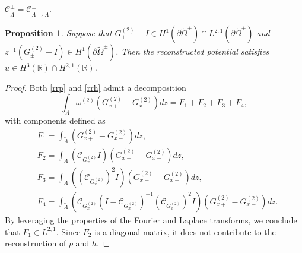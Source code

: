 \documentclass[preprint,compress,12pt]{elsarticle}
\newtheorem{proposition}[theorem]{Proposition}
\numberwithin{equation}{section}
\begin{document}
$\mathcal{C}_{\widetilde{\Lambda}}^{\pm}=\mathcal{C}_{\widetilde{\Lambda}\rightarrow\widetilde{\Lambda}}^{\pm}$.
\begin{proposition}\label{refa}
Suppose that $G^{(2)}_{\pm}-I\in H^{1}(\partial\widetilde{\Omega}^{\pm})\cap L^{2,1}(\partial\widetilde{\Omega}^{\pm})$
 and $z^{-1}(G^{(2)}_{\pm}-I )\in H^{1}(\partial\widetilde{\Omega}^{\pm})$.
Then the reconstructed potential satisfies $u\in H^{3}(\mathbb{R})\cap H^{2,1}(\mathbb{R})$.
\end{proposition}
\begin{proof}
Both \eqref{rrp} and \eqref{rrh} admit a decomposition
\begin{equation}\label{sgb}
\int_{\widetilde{\Lambda}}\omega^{(2)}\left(G^{(2)}_{x+}-G^{(2)}_{x-}\right)dz=F_{1}+F_{2}+F_{3}+F_{4},
\end{equation}
 with components defined as
\begin{equation*}
\begin{aligned}
&F_{1}=\int_{\widetilde{\Lambda}}\left(G^{(2)}_{x+}-G^{(2)}_{x-}\right)dz,\\
&F_{2}=\int_{\widetilde{\Lambda}}\left(\mathcal{C}_{G^{(2)}_{x}}I\right)\left(G^{(2)}_{x+}-G^{(2)}_{x-}\right)dz,\\
&F_{3}=\int_{\widetilde{\Lambda}}\left(\left(\mathcal{C}_{G^{(2)}_{x}}\right)^{2}I\right)\left(G^{(2)}_{x+}-G^{(2)}_{x-}\right)dz,\\
&F_{4}=\int_{\widetilde{\Lambda}}\left(\mathcal{C}_{G^{(2)}_{x}}\left(I-\mathcal{C}_{G^{(2)}_{x}}\right)^{-1}\left(\mathcal{C}_{G^{(2)}_{x}}\right)^{2}I\right)\left(G^{(2)}_{x+}-G^{(2)}_{x-}\right)dz.
\end{aligned}
\end{equation*}
By leveraging the properties of the Fourier and Laplace transforms, we conclude that $F_{1}\in L^{2,1}$. Since $F_{2}$ is a diagonal matrix, it does not contribute to the reconstruction of $p$ and $h$.


\end{proof}
\end{document}
